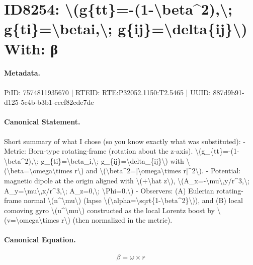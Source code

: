 \section*{ID8254: \textbackslash{}(g\{tt\}=-(1-\textbackslash{}beta\textasciicircum{}2),\textbackslash{}; g\{ti\}=\textbackslash{}betai,\textbackslash{}; g\{ij\}=\textbackslash{}delta\{ij\}\textbackslash{}) With: β}
\paragraph{Metadata.}
PiID: 7574811935670 | RTEID: RTE:P32052.1150:T2.5465 | UUID: 887d9b91-d125-5c4b-b3b1-cccf82cde7de

\paragraph{Canonical Statement.}
Short summary of what I chose (so you know exactly what was substituted): - Metric: Born-type rotating-frame (rotation about the z-axis). \textbackslash{}(g\_\{tt\}=-(1-\textbackslash{}beta\textasciicircum{}2),\textbackslash{}; g\_\{ti\}=\textbackslash{}beta\_i,\textbackslash{}; g\_\{ij\}=\textbackslash{}delta\_\{ij\}\textbackslash{}) with \textbackslash{}(\textbackslash{}beta=\textbackslash{}omega\textbackslash{}times r\textbackslash{}) and \textbackslash{}(\textbackslash{}beta\textasciicircum{}2=|\textbackslash{}omega\textbackslash{}times r|\textasciicircum{}2\textbackslash{}). - Potential: magnetic dipole at the origin aligned with \textbackslash{}(+\textbackslash{}hat z\textbackslash{}), \textbackslash{}(A\_x=-\textbackslash{}mu\textbackslash{},y/r\textasciicircum{}3,\textbackslash{}; A\_y=\textbackslash{}mu\textbackslash{},x/r\textasciicircum{}3,\textbackslash{}; A\_z=0,\textbackslash{}; \textbackslash{}Phi=0.\textbackslash{}) - Observers: (A) Eulerian rotating-frame normal \textbackslash{}(n\textasciicircum{}\textbackslash{}mu\textbackslash{}) (lapse \textbackslash{}(\textbackslash{}alpha=\textbackslash{}sqrt\{1-\textbackslash{}beta\textasciicircum{}2\}\textbackslash{})), and (B) local comoving gyro \textbackslash{}(u\textasciicircum{}\textbackslash{}mu\textbackslash{}) constructed as the local Lorentz boost by \textbackslash{}(v=\textbackslash{}omega\textbackslash{}times r\textbackslash{}) (then normalized in the metric).

\paragraph{Canonical Equation.}
\[
\beta=\omega\times r
\]

